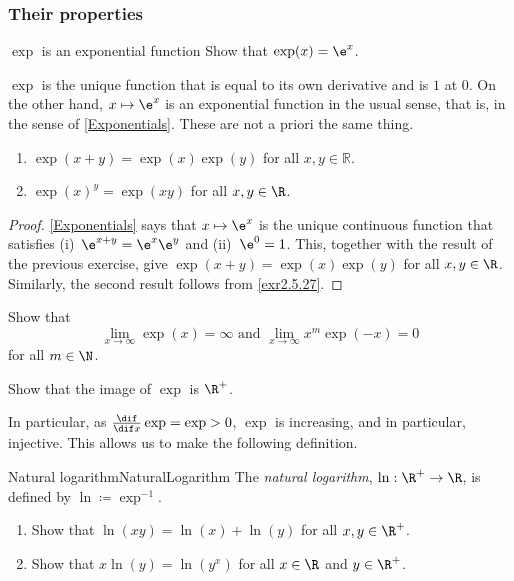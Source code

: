 \subsubsection{Their properties}

\begin{exr}{$\exp$ is an exponential function}{}
Show that $\exp (x)=\e ^x$.
\begin{rmk}
$\exp$ is the unique function that is equal to its own derivative and is $1$ at $0$.  On the other hand, $x\mapsto \e ^x$ is an exponential function in the usual sense, that is, in the sense of \cref{Exponentials}.  These are not a priori the same thing.
\end{rmk}
\end{exr}
\begin{crl}{}{}
\begin{enumerate}
\item $\exp (x+y)=\exp (x)\exp (y)$ for all $x,y \in \mathbb{R}$.
\item $\exp (x)^y=\exp (xy)$ for all $x,y\in \R$.
\end{enumerate}
\begin{proof}
\cref{Exponentials} says that $x\mapsto \e ^x$ is the unique continuous function that satisfies (i)~$\e ^{x+y}=\e ^x\e ^y$ and (ii)~$\e ^0=1$.  This, together with the result of the previous exercise, give $\exp (x+y)=\exp (x)\exp (y)$ for all $x,y\in \R$.  Similarly, the second result follows from \cref{exr2.5.27}.
\end{proof}
\end{crl}
\begin{exr}{}{}
Show that
\begin{equation}
\lim _{x\to \infty}\exp (x)=\infty \text{ and }\lim _{x\to \infty}x^m\exp (-x)=0
\end{equation}
for all $m\in \N$.
\end{exr}
\begin{exr}{}{}
Show that the image of $\exp$ is $\R ^+$.
\end{exr}
In particular, as $\frac{\dif}{\dif x}\exp =\exp >0$, $\exp$ is increasing, and in particular, injective.  This allows us to make the following definition.
\begin{dfn}{Natural logarithm}{NaturalLogarithm}
The \emph{natural logarithm}, $\ln :\R ^+\rightarrow \R$, is defined by $\ln \coloneqq \exp ^{-1}$.
\end{dfn}
\begin{exr}{}{}
\begin{enumerate}
\item Show that $\ln (xy)=\ln (x)+\ln (y)$ for all $x,y\in \R ^+$.
\item Show that $x\ln (y)=\ln (y^x)$ for all $x\in \R$ and $y\in \R ^+$.
\end{enumerate}
\end{exr}
